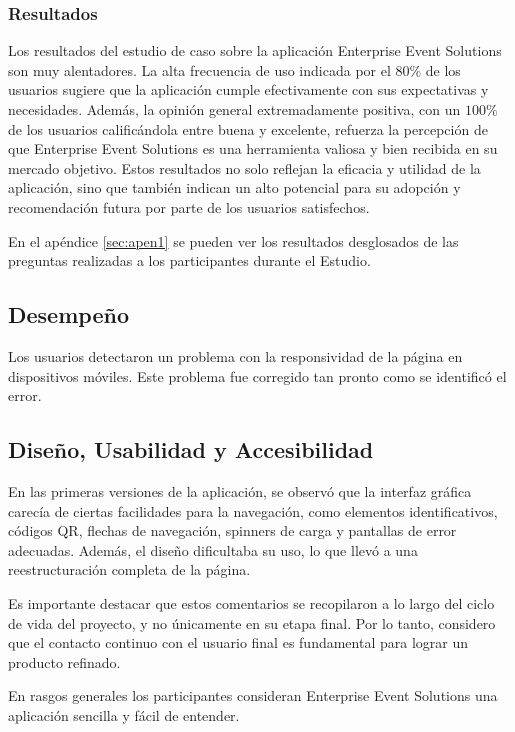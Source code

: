\subsubsection*{Resultados}
Los resultados del estudio de caso sobre la aplicación Enterprise Event Solutions son muy alentadores. La alta frecuencia de uso indicada por el \(80\%\)
de los usuarios sugiere que la aplicación cumple efectivamente con sus expectativas y necesidades. Además, la opinión general extremadamente positiva, con un \(100\%\) 
de los usuarios calificándola entre buena y excelente, refuerza la percepción de que Enterprise Event Solutions es una herramienta valiosa y bien recibida en su mercado objetivo. 
Estos resultados no solo reflejan la eficacia y utilidad de la aplicación, sino que también indican un alto potencial para su adopción y recomendación futura por parte de los usuarios 
satisfechos.

En el apéndice \ref{sec:apen1} se pueden ver los resultados desglosados de las preguntas realizadas a los participantes durante el Estudio.
\subsection{Desempeño}

Los usuarios detectaron un problema con la responsividad de la página en dispositivos móviles. Este problema
fue corregido tan pronto como se identificó el error.

\subsection{Diseño, Usabilidad y Accesibilidad}
En las primeras versiones de la aplicación, se observó que la interfaz gráfica carecía de ciertas facilidades para la navegación, como elementos
identificativos, códigos QR, flechas de navegación, spinners de carga y pantallas de error adecuadas. Además, el diseño dificultaba su uso, lo que llevó a una reestructuración completa de la página.

Es importante destacar que estos comentarios se recopilaron a lo largo del ciclo de vida del proyecto, y no únicamente en su etapa final.
Por lo tanto, considero que el contacto continuo con el usuario final es fundamental para lograr un producto refinado.

En rasgos generales los participantes consideran Enterprise Event Solutions una aplicación sencilla y fácil de entender.
